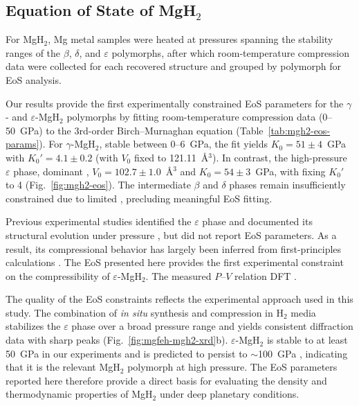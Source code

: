 \documentclass[draft,jgrga,12pt]{agujournal2019}
\begin{document}
\subsection{Equation of State of MgH$_2$}

For MgH$_2$, Mg metal samples were heated at pressures spanning the stability ranges of the $\beta$, $\delta$, and $\varepsilon$ polymorphs, after which room-temperature compression data were collected for each recovered structure and grouped by polymorph for EoS analysis.

Our results provide the first experimentally constrained EoS parameters for the $\gamma$- and $\varepsilon$-MgH$_2$ polymorphs by fitting room-temperature compression data (0--50~{GPa}) to the 3rd-order Birch–Murnaghan equation (Table~\ref{tab:mgh2-eos-params}). 
For $\gamma$-MgH$_2$, stable between 0--6~{GPa}, the fit yields $K_0=51{\pm}4$~GPa with $K_0'=4.1{\pm}0.2$ (with $V_0$ fixed to 121.11~Å$^3$). 
In contrast, the high-pressure $\varepsilon$ phase, dominant ,  $V_0=102.7{\pm}1.0$~Å$^3$ and $K_0=54{\pm}3$~GPa, with fixing $K_0'$ to 4 (Fig.~\ref{fig:mgh2-eos}). 
The intermediate $\beta$ and $\delta$ phases remain insufficiently constrained due to limited , precluding meaningful EoS fitting. 

Previous experimental studies identified the $\varepsilon$ phase and documented its structural evolution  under pressure \cite{moriwaki_structural_2006}, but did not report EoS parameters. 
As a result, its compressional behavior has largely been inferred from first-principles calculations \cite{cui_structural_2008}. 
The EoS presented here provides the first experimental constraint on the compressibility of $\varepsilon$-MgH$_2$. 
The measured $P$–$V$ relation  DFT  \cite{cui_structural_2008}.

The quality of the EoS constraints reflects the experimental approach used in this study. 
The combination of \textit{in situ} synthesis and compression in H$_2$ media stabilizes the $\varepsilon$ phase over a broad pressure range and yields consistent diffraction data with sharp peaks (Fig.~\ref{fig:mgfeh-mgh2-xrd}b). 
$\varepsilon$-MgH$_2$ is stable to at least 50~{GPa} in our experiments and is predicted to persist to $\sim$100~{GPa} \cite{cui_structural_2008}, indicating that it is the relevant MgH$_2$ polymorph at high pressure. 
The EoS parameters reported here therefore provide a direct basis for evaluating the density and thermodynamic properties of MgH$_2$ under deep planetary conditions.
\end{document}
